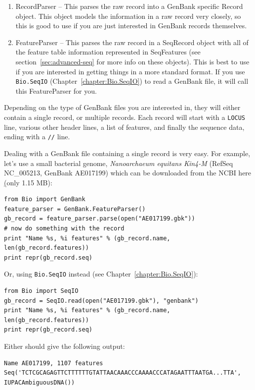 \documentclass{report}
\begin{document}
\begin{enumerate}
  \item RecordParser -- This parses the raw record into a GenBank specific Record object. This object models the information in a raw record very closely, so this is good to use if you are just interested in GenBank records themselves.

  \item FeatureParser -- This parses the raw record in a SeqRecord object with all of the feature table information represented in SeqFeatures (see section~\ref{sec:advanced-seq} for more info on these objects). This is best to use if you are interested in getting things in a more standard format.  If you use \verb|Bio.SeqIO| (Chapter~\ref{chapter:Bio.SeqIO}) to read a GenBank file, it will call this FeatureParser for you.
\end{enumerate}

Depending on the type of GenBank files you are interested in, they will either contain a single record, or multiple records.  Each record will start with a {\tt LOCUS} line, various other header lines, a list of features, and finally the sequence data, ending with a {\tt //} line.

Dealing with a GenBank file containing a single record is very easy.  For example, let's use a small bacterial genome, \emph{Nanoarchaeum equitans Kin4-M} (RefSeq NC\_005213, GenBank AE017199) which can be downloaded from the NCBI here \href{ftp://ftp.ncbi.nlm.nih.gov/genbank/genomes/Bacteria/Nanoarchaeum_equitans/AE017199.gbk} (only 1.15 MB):

\begin{verbatim}
from Bio import GenBank
feature_parser = GenBank.FeatureParser()
gb_record = feature_parser.parse(open("AE017199.gbk"))
# now do something with the record
print "Name %s, %i features" % (gb_record.name, len(gb_record.features))
print repr(gb_record.seq)
\end{verbatim}

Or, using \verb|Bio.SeqIO| instead (see Chapter~\ref{chapter:Bio.SeqIO}):

\begin{verbatim}
from Bio import SeqIO
gb_record = SeqIO.read(open("AE017199.gbk"), "genbank")
print "Name %s, %i features" % (gb_record.name, len(gb_record.features))
print repr(gb_record.seq)
\end{verbatim}

Either should give the following output:

\begin{verbatim}
Name AE017199, 1107 features
Seq('TCTCGCAGAGTTCTTTTTTGTATTAACAAACCCAAAACCCATAGAATTTAATGA...TTA', IUPACAmbiguousDNA())
\end{verbatim}
\end{document}
